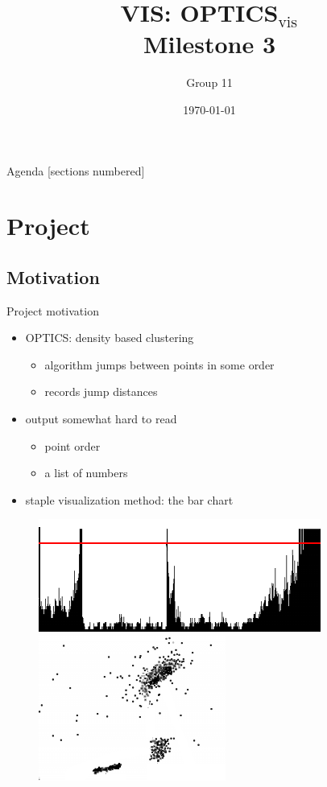 \documentclass[naustrian]{beamer}
\title{VIS: OPTICS$_\text{vis}$\\Milestone 3}
\date{\today}
\author{Group 11}
\institute{Fakultät für Informatik}
\begin{document}
\maketitle

\begin{frame}{Agenda}
    [sections numbered]
    \tableofcontents
\end{frame}

\section{Project}

\subsection{Motivation}

\begin{frame}{Project motivation}
    \begin{itemize}
        \item OPTICS: density based clustering
            \begin{itemize}
                \item algorithm jumps between points in some order
                \item records jump distances
            \end{itemize}
        \item output somewhat hard to read
            \begin{itemize}
                \item point order
                \item a list of numbers
            \end{itemize}
        \item staple visualization method: the bar chart
    \end{itemize}
    \begin{figure}[h]
        \centering
        \includegraphics[height=.3\textheight]{img/optics-edited}
        \vspace{1em}
        \includegraphics[width=.3\textwidth]{img/optics-edited-points-black}
    \end{figure}
\end{frame}
\end{document}
